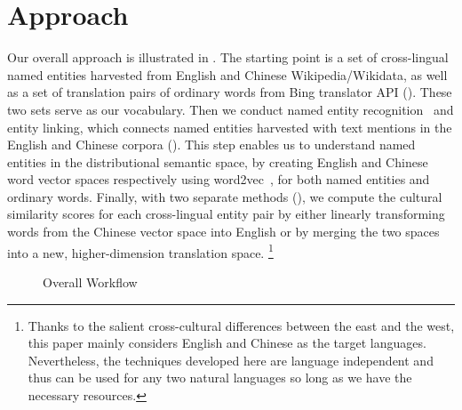 \section{Approach}
Our overall approach is illustrated in .
The starting point is a set of cross-lingual
named entities harvested from English and Chinese Wikipedia/Wikidata,
as well as a set of translation pairs of ordinary words from Bing translator API
().
These two sets serve as our vocabulary.
Then we conduct named entity recognition~\cite{finkel2005incorporating,lample2016neural,ma2016end,liu2017empower} and entity linking\cite{shen2015entity,RRDA11,ChengRo13}, which connects named entities harvested with
text mentions
 in the English
and Chinese corpora
().
This step enables us to understand named entities in the distributional semantic space, by creating English and Chinese word vector spaces respectively using word2vec~\cite{Mikolov2013DistributedRO}, for both named entities and ordinary words.
Finally, with two separate methods (),
we compute the cultural similarity scores
for each cross-lingual entity pair by either linearly transforming words
from the Chinese vector space into English or by merging the two spaces into
a new, higher-dimension translation space.
\footnote{Thanks to the salient cross-cultural differences between
the east and the west, this paper mainly considers English
and Chinese as the target languages. Nevertheless, the techniques developed here are language independent and thus can
be used for any two natural languages so long as we have the
necessary resources.}
%
%

\begin{figure}[t]
	\centering
	\caption{Overall Workflow}
	\label{fig:approach}
\end{figure}

